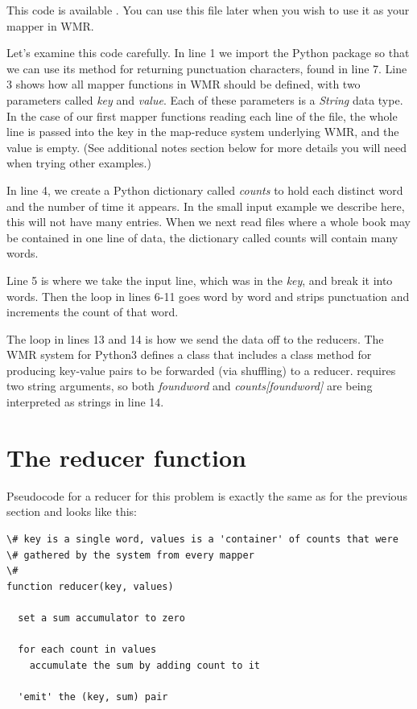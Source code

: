 \documentclass[letterpaper,10pt,openany,oneside]{sphinxmanual}
\begin{document}
This code is available .
You can use this file later when you wish to use it as your mapper in WMR.

Let's examine this code carefully. In line 1 we import the Python
 package so that we can use its method for returning
punctuation characters, found in line 7. Line 3 shows how all
mapper functions in WMR should be defined, with two parameters
called \emph{key} and \emph{value}. Each of these parameters is a \emph{String}
data type. In the case of our first mapper functions reading each
line of the file, the whole line is passed into the key in the
map-reduce system underlying WMR, and the value is empty. (See
additional notes section below for more details you will need when
trying other examples.)

In line 4, we create a Python dictionary called \emph{counts} to hold
each distinct word and the number of time it appears. In the small
input example we describe here, this will not have many entries.
When we next read files where a whole book may be contained in one
line of data, the dictionary called counts will contain many
words.

Line 5 is where we take the input line, which was in the \emph{key}, and
break it into words. Then the loop in lines 6-11 goes word by word
and strips punctuation and increments the count of that word.

The loop in lines 13 and 14 is how we send the data off to the
reducers. The WMR system for Python3 defines a class  that
includes a class method  for producing key-value pairs to
be forwarded (via shuffling) to a reducer.  requires
two string arguments, so both \emph{foundword} and \emph{counts{[}foundword{]}}
are being interpreted as strings in line 14.


\section{The reducer function}
\label{wmr_py/wmr_py:the-reducer-function}
Pseudocode for a reducer for this problem is exactly the same as
for the previous section and looks like this:

\begin{Verbatim}[commandchars=\\\{\}]
\# key is a single word, values is a 'container' of counts that were
\# gathered by the system from every mapper
\#
function reducer(key, values)

  set a sum accumulator to zero

  for each count in values
    accumulate the sum by adding count to it

  'emit' the (key, sum) pair
\end{Verbatim}
\end{document}
